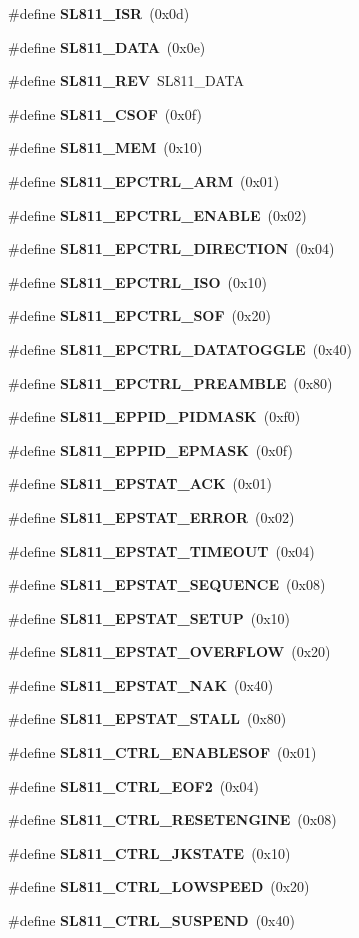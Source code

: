 \begin{CompactItemize}
\item 
\#define {\bf SL811\_\-ISR}~(0x0d)
\item 
\#define {\bf SL811\_\-DATA}~(0x0e)
\item 
\#define {\bf SL811\_\-REV}~SL811\_\-DATA
\item 
\#define {\bf SL811\_\-CSOF}~(0x0f)
\item 
\#define {\bf SL811\_\-MEM}~(0x10)
\item 
\#define {\bf SL811\_\-EPCTRL\_\-ARM}~(0x01)
\item 
\#define {\bf SL811\_\-EPCTRL\_\-ENABLE}~(0x02)
\item 
\#define {\bf SL811\_\-EPCTRL\_\-DIRECTION}~(0x04)
\item 
\#define {\bf SL811\_\-EPCTRL\_\-ISO}~(0x10)
\item 
\#define {\bf SL811\_\-EPCTRL\_\-SOF}~(0x20)
\item 
\#define {\bf SL811\_\-EPCTRL\_\-DATATOGGLE}~(0x40)
\item 
\#define {\bf SL811\_\-EPCTRL\_\-PREAMBLE}~(0x80)
\item 
\#define {\bf SL811\_\-EPPID\_\-PIDMASK}~(0xf0)
\item 
\#define {\bf SL811\_\-EPPID\_\-EPMASK}~(0x0f)
\item 
\#define {\bf SL811\_\-EPSTAT\_\-ACK}~(0x01)
\item 
\#define {\bf SL811\_\-EPSTAT\_\-ERROR}~(0x02)
\item 
\#define {\bf SL811\_\-EPSTAT\_\-TIMEOUT}~(0x04)
\item 
\#define {\bf SL811\_\-EPSTAT\_\-SEQUENCE}~(0x08)
\item 
\#define {\bf SL811\_\-EPSTAT\_\-SETUP}~(0x10)
\item 
\#define {\bf SL811\_\-EPSTAT\_\-OVERFLOW}~(0x20)
\item 
\#define {\bf SL811\_\-EPSTAT\_\-NAK}~(0x40)
\item 
\#define {\bf SL811\_\-EPSTAT\_\-STALL}~(0x80)
\item 
\#define {\bf SL811\_\-CTRL\_\-ENABLESOF}~(0x01)
\item 
\#define {\bf SL811\_\-CTRL\_\-EOF2}~(0x04)
\item 
\#define {\bf SL811\_\-CTRL\_\-RESETENGINE}~(0x08)
\item 
\#define {\bf SL811\_\-CTRL\_\-JKSTATE}~(0x10)
\item 
\#define {\bf SL811\_\-CTRL\_\-LOWSPEED}~(0x20)
\item 
\#define {\bf SL811\_\-CTRL\_\-SUSPEND}~(0x40)
\item 

\end{CompactItemize}
